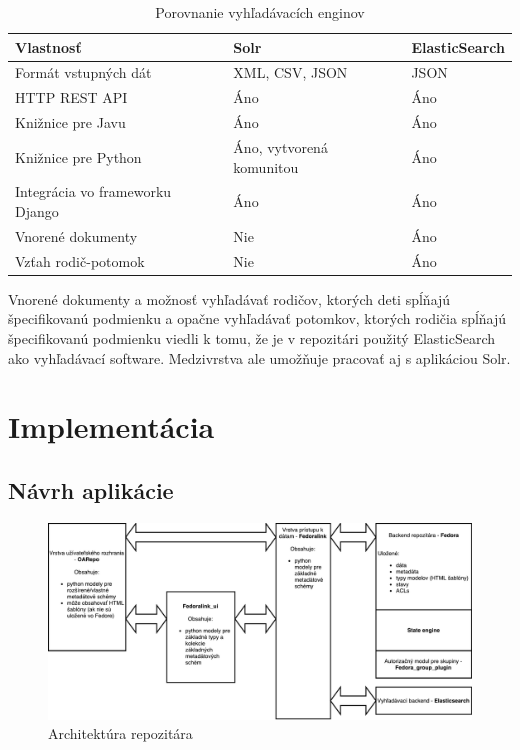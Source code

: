\documentclass[thesis=M,slovak]{FITthesis}[2013/05/06]
\begin{document}
\begin{table}[!htbp]\centering
 	\caption[ElasticSearch vs. Solr]{Porovnanie vyhľadávacích enginov}\label{tab:searchEngines}
\begin{tabularx}{\textwidth}{|l|X|X|} \hline
Vlastnosť & Solr                         & ElasticSearch \\ \hline
Formát vstupných dát   & XML, CSV, JSON	 & JSON \\ \hline
HTTP REST API & Áno & Áno \\ \hline
Knižnice pre Javu & Áno & Áno \\ \hline
Knižnice pre Python & Áno, vytvorená komunitou & Áno \\ \hline
Integrácia vo frameworku Django & Áno & Áno \\ \hline
Vnorené dokumenty & Nie & Áno \\ \hline
Vzťah rodič-potomok & Nie & Áno \\ \hline
\end{tabularx}
\end{table}


Vnorené dokumenty a možnosť vyhľadávať rodičov, ktorých deti spĺňajú špecifikovanú podmienku a opačne vyhľadávať potomkov, ktorých rodičia spĺňajú špecifikovanú podmienku viedli k tomu, že je v repozitári použitý ElasticSearch ako vyhľadávací software. Medzivrstva ale umožňuje pracovať aj s aplikáciou Solr.

\chapter{Implementácia}
\section{Návrh aplikácie}
\begin{figure}\centering
	\includegraphics[width=1.0\textwidth]{diagramy/Architektura_repozitara.pdf}
 	\caption[Architektúra repozitára]{Architektúra repozitára}\label{graphics:architektura_repozitara}
\end{figure}
\end{document}
